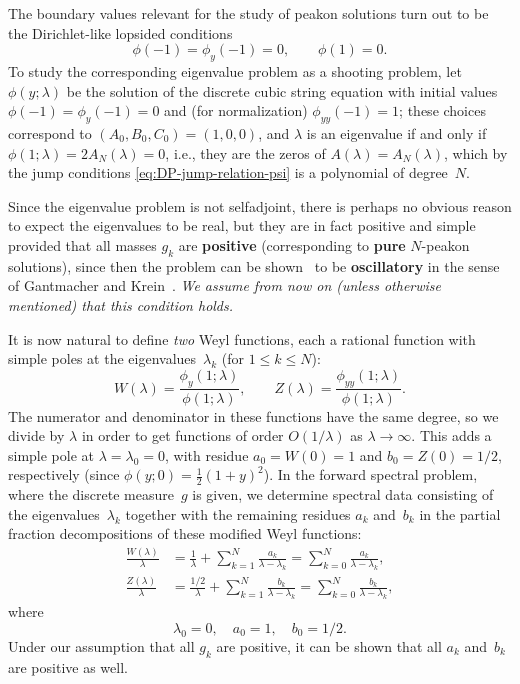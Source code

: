 \documentclass[10pt,a4paper]{article} \pdfoutput=1 
\begin{document}
The boundary values relevant for the study of peakon solutions turn out to be
the Dirichlet-like lopsided conditions
\begin{equation}
  \label{eq:DP-cubic-string-boundary-conditions-y}
  \phi(-1) = \phi_y(-1) = 0
  , \qquad
  \phi(1) = 0
  .
\end{equation}
To study the corresponding eigenvalue problem as a shooting problem,
let $\phi(y;\lambda)$ be the solution of the discrete cubic string equation
with initial values $\phi(-1) = \phi_y(-1) = 0$ and (for normalization)
$\phi_{yy}(-1) = 1$;
these choices correspond to $(A_0,B_0,C_0) = (1,0,0)$,
and $\lambda$ is an eigenvalue if and only if
$\phi(1;\lambda) = 2 A_N(\lambda) = 0$,
i.e., they are the zeros of $A(\lambda) = A_N(\lambda)$,
which by the jump conditions \eqref{eq:DP-jump-relation-psi}
is a polynomial of degree~$N$.

Since the eigenvalue problem is not selfadjoint,
there is perhaps no obvious reason to expect the eigenvalues to be real,
but they are in fact positive and simple provided that all masses $g_k$ are \textbf{positive}
(corresponding to \textbf{pure} $N$-peakon solutions),
since then the problem can be shown~\cite{lundmark-szmigielski:2005:DPlong}
to be \textbf{oscillatory}
in the sense of Gantmacher and Krein~\cite{gantmacher-krein:2002:oscillation-matrices}.
\emph{We assume from now on (unless otherwise mentioned) that this condition holds.}

It is now natural to define \emph{two} Weyl functions, each a rational function
with simple poles at the eigenvalues~$\lambda_k$
(for $1 \le k \le N$):
\begin{equation}\label{eq:DP-weyl}
  W(\lambda) = \frac{\phi_y(1;\lambda)}{\phi(1;\lambda)}
  , \qquad
  Z(\lambda) = \frac{\phi_{yy}(1;\lambda)}{\phi(1;\lambda)}
  .
\end{equation}
The numerator and denominator in these functions have the same degree,
so we divide by $\lambda$ in order to get functions of order
$O(1/\lambda)$ as $\lambda \to \infty$.
This adds a simple pole at $\lambda = \lambda_0 = 0$, with residue $a_0 = W(0) = 1$
and $b_0 = Z(0) = 1/2$, respectively (since $\phi(y;0) = \tfrac12 (1+y)^2$).
In the forward spectral problem, where the discrete measure~$g$ is given,
we determine spectral data consisting of the eigenvalues~$\lambda_k$
together with the remaining residues $a_k$ and~$b_k$
in the partial fraction decompositions of these modified Weyl functions:
\begin{align}
  \label{eq:DP-parfracW}
  \frac{W(\lambda)}{\lambda} &
  = \frac{1}{\lambda} + \sum_{k=1}^N \frac{a_k}{\lambda - \lambda_k}
  = \sum_{k=0}^N \frac{a_k}{\lambda - \lambda_k}
  , \\
  \label{eq:DP-parfracZ}
  \frac{Z(\lambda)}{\lambda} &
  = \frac{1/2}{\lambda} + \sum_{k=1}^N \frac{b_k}{\lambda - \lambda_k}
  = \sum_{k=0}^N \frac{b_k}{\lambda - \lambda_k}
  ,
\end{align}
where
\begin{equation}
  \lambda_0=0
  ,\quad
  a_0=1
  ,\quad
  b_0=1/2
  .
\end{equation}
Under our assumption that all $g_k$ are positive,
it can be shown that all $a_k$ and~$b_k$ are positive as well.
\end{document}
